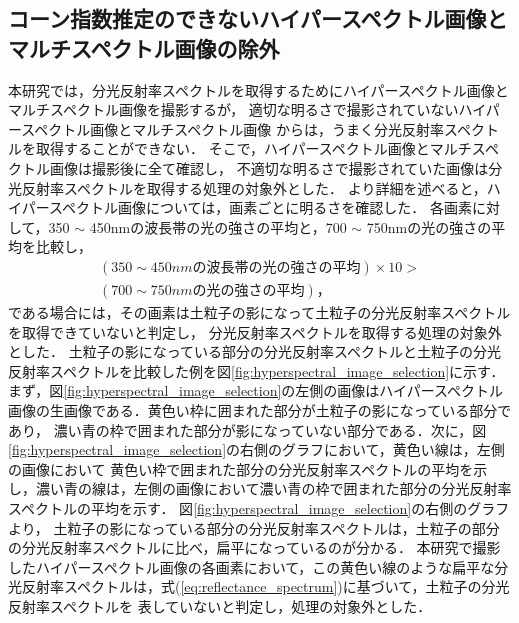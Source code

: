 \clearpage

\subsection{コーン指数推定のできないハイパースペクトル画像とマルチスペクトル画像の除外}
\label{ssec:SpectralImageCondition}

本研究では，分光反射率スペクトルを取得するためにハイパースペクトル画像とマルチスペクトル画像を撮影するが，
適切な明るさで撮影されていないハイパースペクトル画像とマルチスペクトル画像
からは，うまく分光反射率スペクトルを取得することができない．
そこで，ハイパースペクトル画像とマルチスペクトル画像は撮影後に全て確認し，
不適切な明るさで撮影されていた画像は分光反射率スペクトルを取得する処理の対象外とした．
より詳細を述べると，ハイパースペクトル画像については，画素ごとに明るさを確認した．
各画素に対して，350 $\sim$ 450nmの波長帯の光の強さの平均と，700 $\sim$ 750nmの光の強さの平均を比較し，
\begin{eqnarray}
(350 \sim 450nmの波長帯の光の強さの平均) \times 10 > \nonumber\\ (700 \sim 750nmの光の強さの平均)，\label{eq:reflectance_spectrum}
\end{eqnarray}
である場合には，その画素は土粒子の影になって土粒子の分光反射率スペクトルを取得できていないと判定し，
分光反射率スペクトルを取得する処理の対象外とした．
土粒子の影になっている部分の分光反射率スペクトルと土粒子の分光反射率スペクトルを比較した例を図\ref{fig:hyperspectral_image_selection}に示す．
まず，図\ref{fig:hyperspectral_image_selection}の左側の画像はハイパースペクトル画像の生画像である．黄色い枠に囲まれた部分が土粒子の影になっている部分であり，
濃い青の枠で囲まれた部分が影になっていない部分である．次に，図\ref{fig:hyperspectral_image_selection}の右側のグラフにおいて，黄色い線は，左側の画像において
黄色い枠で囲まれた部分の分光反射率スペクトルの平均を示し，濃い青の線は，左側の画像において濃い青の枠で囲まれた部分の分光反射率スペクトルの平均を示す．
図\ref{fig:hyperspectral_image_selection}の右側のグラフより，
土粒子の影になっている部分の分光反射率スペクトルは，土粒子の部分の分光反射率スペクトルに比べ，扁平になっているのが分かる．
本研究で撮影したハイパースペクトル画像の各画素において，この黄色い線のような扁平な分光反射率スペクトルは，式(\ref{eq:reflectance_spectrum})に基づいて，土粒子の分光反射率スペクトルを
表していないと判定し，処理の対象外とした．

